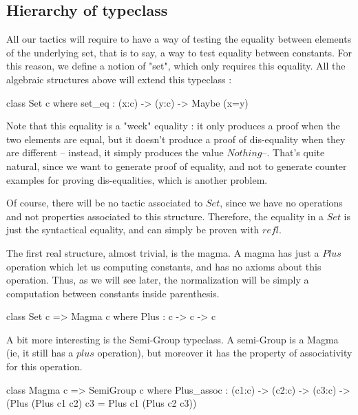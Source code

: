 \documentclass{sigplanconf}
\begin{document}
\subsection {Hierarchy of typeclass}

All our tactics will require to have a way of testing the equality between elements of the underlying set, that is to say, a way to test equality between constants. For this reason, we define a notion of "set", which only requires this equality. All the algebraic structures above will extend this typeclass :

\begin{code}[caption=Set, captionpos=b, label=lst1:haskell2]
class Set c where
    set_eq : (x:c) -> (y:c) -> Maybe (x=y)
\end{code}

Note that this equality is a "week" equality : it only produces a proof when the two elements are equal, but it doesn't produce a proof of dis-equality when they are different -- instead, it simply produces the value $Nothing$--. That's quite natural, since we want to generate proof of equality, and not to generate counter examples for proving dis-equalities, which is another problem.

Of course, there will be no tactic associated to $Set$, since we have no operations and not properties associated to this structure. Therefore, the equality in a $Set$ is just the syntactical equality, and can simply be proven with $refl$.

The first real structure, almost trivial, is the magma. A magma has just a $Plus$ operation which let us computing constants, and has no axioms about this operation. Thus, as we will see later, the normalization will be simply a computation between constants inside parenthesis.

\begin{code}[caption=Magma, captionpos=b, label=lst1:haskell2]   
class Set c => Magma c where
    Plus : c -> c -> c
\end{code}

A bit more interesting is the Semi-Group typeclass. A semi-Group is a Magma (ie, it still has a $plus$ operation), but moreover it has the property of associativity for this operation.

\begin{code}[caption=Semi-Group, captionpos=b, label=lst1:haskell2]   
class Magma c => SemiGroup c where
    Plus_assoc : (c1:c) -> (c2:c) -> (c3:c) 
           -> (Plus (Plus c1 c2) c3 
                = Plus c1 (Plus c2 c3))
\end{code}
\end{document}
